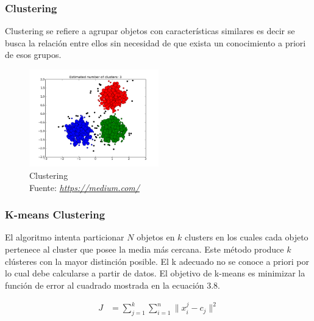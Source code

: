 \subsubsection*{Clustering}
Clustering se refiere a agrupar objetos con características similares es decir se busca la relación entre ellos sin necesidad de que exista un conocimiento a priori de esos grupos.
\begin{figure}[H]
	\centering
	\includegraphics[width=0.5\textwidth]{Figures/clustering.png}
	\caption{Clustering \\ Fuente:  \href{https://medium.com/deep-math-machine-learning-ai/different-types-of-machine-learning-and-their-types-34760b9128a2}{\textit{https://medium.com/}}}
	\label{Clustering}
\end{figure} 
\subsubsection*{K-means Clustering}
El algoritmo intenta particionar $N$ objetos en $k$ clusters en los cuales cada objeto pertenece al cluster que posee la media más cercana. Este método produce $k$ clústeres con la mayor distinción posible. El k adecuado no se conoce a priori por lo cual debe calcularse a partir de datos. El objetivo de k-means es minimizar la función de error al cuadrado mostrada en la ecuación 3.8.

\begin{equation}
  \label{eq:clustering}
  \begin{aligned}
  J&= \sum_{j=1}^{k} \sum_{i=1}^{n}\parallel x_{i}^j - c_{j}\parallel ^2
  \end{aligned}
\end{equation}

